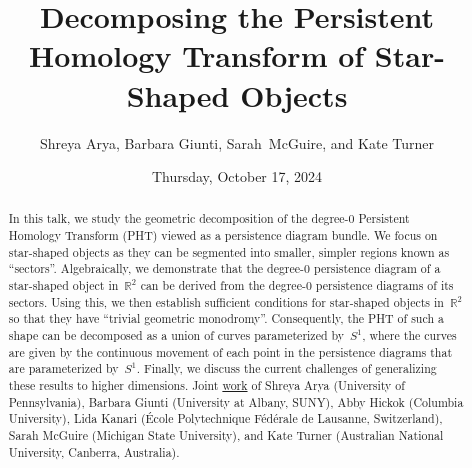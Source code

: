 \documentclass{UAmathtalk}
\author{Shreya Arya, Barbara Giunti, Sarah~McGuire, and Kate Turner}
\title{Decomposing the Persistent Homology Transform of Star-Shaped Objects}
\date{Thursday, October 17, 2024}
\begin{document}
\maketitle

\begin{abstract}
In this talk, we study the geometric decomposition of the \mbox{degree-$0$} Persistent Homology Transform (PHT) viewed as a persistence diagram bundle. We focus on star-shaped objects as they can be segmented into smaller, simpler regions known as “sectors”. Algebraically, we demonstrate that the degree-$0$ persistence diagram of a star-shaped object in~$\mathbb{R}^2$ can be derived from the degree-$0$ persistence diagrams of its sectors. Using this, we then establish sufficient conditions for star-shaped objects in~$\mathbb{R}^2$ so that they have “trivial geometric monodromy”. Consequently, the PHT of such a shape can be decomposed as a union of curves parameterized by~$S^1$, where the curves are given by the continuous movement of each point in the persistence diagrams that are parameterized by~$S^1$. Finally, we discuss the current challenges of generalizing these results to higher dimensions.
Joint \href{https://arxiv.org/abs/2408.14995}{work} of Shreya Arya (University of Pennsylvania), Barbara Giunti (University at Albany, SUNY), Abby Hickok (Columbia University), Lida Kanari (École Polytechnique Fédérale de Lausanne, Switzerland), Sarah McGuire (Michigan State University), and Kate Turner (Australian National University, Canberra, Australia).
\end{abstract}
\end{document}
